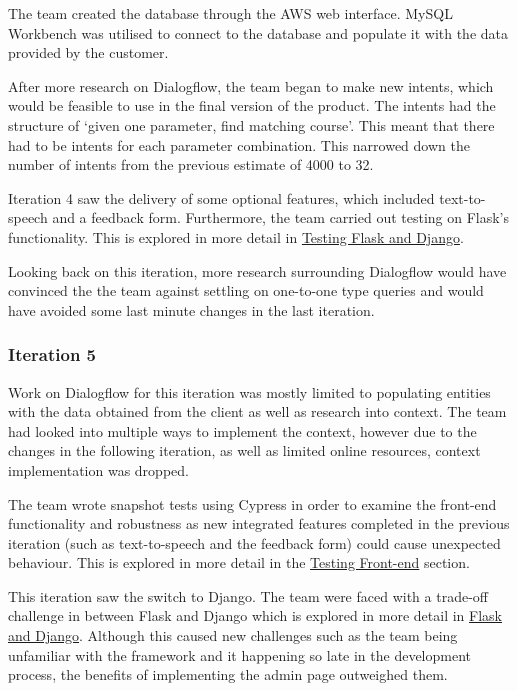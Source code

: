 \documentclass{l3proj}
\begin{document}
The team created the database through the AWS web interface. MySQL Workbench was utilised to connect to the database and populate it with the data provided by the customer.

After more research on Dialogflow, the team began to make new intents, which would be feasible to use in the final version of the product. The intents had the structure of ‘given one parameter, find matching course'. This meant that there had to be intents for each parameter combination. This narrowed down the number of intents from the previous estimate of 4000 to 32.

Iteration 4 saw the delivery of some optional features, which included text-to-speech and a feedback form. Furthermore, the team carried out testing on Flask's functionality. This is explored in more detail in \hyperref[subsubsec:testpython]{Testing Flask and Django}.

Looking back on this iteration, more research surrounding Dialogflow would have convinced the the team against settling on one-to-one type queries and would have avoided some last minute changes in the last iteration.


\subsubsection{Iteration 5}
\label{subsubsec:iter5}
Work on Dialogflow for this iteration was mostly limited to populating entities with the data obtained from the client as well as research into context. The team had looked into multiple ways to implement the context, however due to the changes in the following iteration, as well as limited online resources, context implementation was dropped.

The team wrote snapshot tests using Cypress \cite{CYPRESS} in order to examine the front-end functionality and robustness as new integrated features completed in the previous iteration (such as text-to-speech and the feedback form) could cause unexpected behaviour. This is explored in more detail in the \hyperref[subsubsec:testfront]{Testing Front-end} section.

This iteration saw the switch to Django. The team were faced with a trade-off challenge in between Flask and Django which is explored in more detail in \hyperref[subsubsec:flaskdjango]{Flask and Django}. Although this caused new challenges such as the team being unfamiliar with the framework and it happening so late in the development process, the benefits of implementing the admin page outweighed them.
\end{document}
